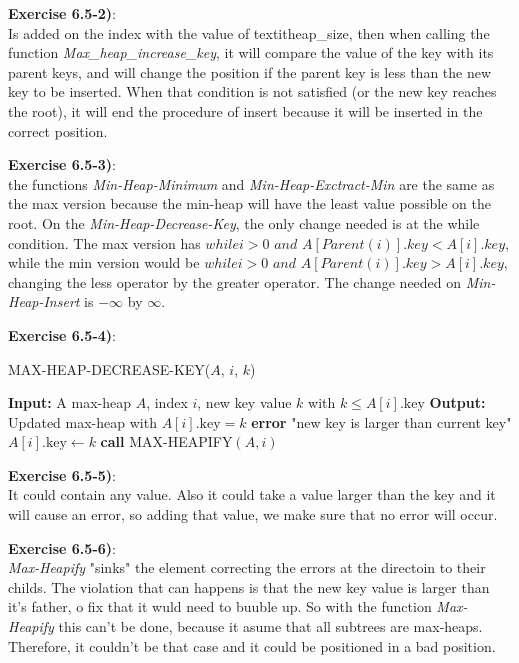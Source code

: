 \documentclass{article}
\newcounter{exercise}[section]   %
\begin{document}
\textbf{Exercise 6.5-2)}:\\
Is added on the index with the value of textit{heap\_size}, then when calling the function
\textit{Max\_heap\_increase\_key}, it will compare the value of the key with its parent keys,
and will change the position if the parent key is less than the new key to be inserted.
When that condition is not satisfied (or the new key reaches the root), it will end the
procedure of insert because it will be inserted in the correct position.

\textbf{Exercise 6.5-3)}:\\
the functions \textit{Min-Heap-Minimum} and \textit{Min-Heap-Exctract-Min} are the same as
the max version because the min-heap will have the least value possible on the root. On the
\textit{Min-Heap-Decrease-Key}, the only change needed is at the while condition. The max
version has \(while i > 0 \textit{ and } A[Parent(i)].key < A[i].key\), while the min version 
would be \(while i > 0 \textit{ and } A[Parent(i)].key > A[i].key\), changing the less operator
by the greater operator. The change needed on \textit{Min-Heap-Insert} is \(-\infty\) by
\(\infty\). 

\textbf{Exercise 6.5-4)}:
\begin{algorithm}[H]
    \caption{MAX-HEAP-DECREASE-KEY($A$, $i$, $k$)}
    \begin{algorithmic}[1]
        \State \textbf{Input:} A max-heap \(A\), index \(i\), new key value \(k\) with \(k \le A[i].\text{key}\)
        \State \textbf{Output:} Updated max-heap with \(A[i].\text{key} = k\)
            \State \textbf{error} "new key is larger than current key"
        \EndIf
        \State \(A[i].\text{key} \gets k\)
        \State \textbf{call} MAX-HEAPIFY\((A,i)\)
    \end{algorithmic}
\end{algorithm}

\textbf{Exercise 6.5-5)}:\\
It could contain any value. Also it could take a value larger than the key and it will cause 
an error, so adding that value, we make sure that no error will occur.

\textbf{Exercise 6.5-6)}:\\
\textit{Max-Heapify} "sinks" the element correcting the errors at the directoin to their 
childs. The violation that can happens is that the new key value is larger than it's father,
o fix that it wuld need to buuble up. So with the function \textit{Max-Heapify} this can't
be done, because it asume that all subtrees are max-heaps. Therefore, it couldn't be that
case and it could be positioned in a bad position.
\end{document}
